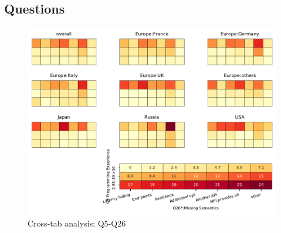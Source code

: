 
\subsection{Questions}


\begin{figure}
\begin{center}
\includegraphics[width=12cm]{../pdfs/Q5-Q26.pdf}
\caption{Cross-tab analysis: Q5-Q26}
\label{fig:Q5-Q26}
\end{center}
\end{figure}
